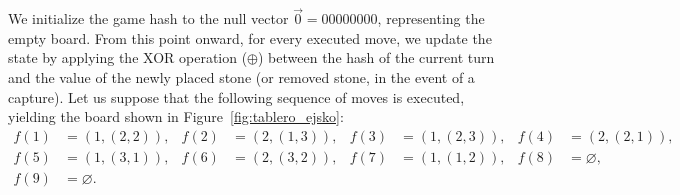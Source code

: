 We initialize the game hash to the null vector \(\vec{0} = 00000000 \), representing the empty board. From this point onward, for every executed move, we update the state by applying the XOR operation (\(\oplus\)) between the hash of the current turn and the value of the newly placed stone (or removed stone, in the event of a capture). Let us suppose that the following sequence of moves is executed, yielding the board shown in Figure~\ref{fig:tablero_ejsko}:
 \begin{align*}
	f(1)&=(1,(2,2)), &f(2)&=(2,(1,3)),	&f(3)&=(1,(2,3)), &f(4)&=(2,(2,1)),\\
	f(5)&=(1,(3,1)), &f(6)&=(2,(3,2)), &f(7)&=(1,(1,2)), &f(8)&=\varnothing,\\
	f(9)&=\varnothing. 
\end{align*} 
